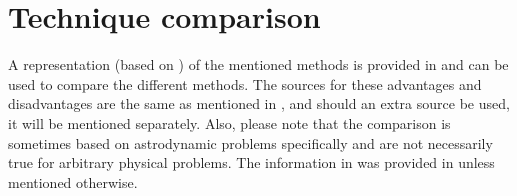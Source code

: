 \section{Technique comparison}
\label{sec:inttechcomp}
A representation (based on \cite{noomen2013int}) of the mentioned methods is provided in  and can be used to compare the different methods. The sources for these advantages and disadvantages are the same as mentioned in , and should an extra source be used, it will be mentioned separately. Also, please note that the comparison is sometimes based on astrodynamic problems specifically and are not necessarily true for arbitrary physical problems. The information in  was provided in \cite{noomen2013int} unless mentioned otherwise. 


